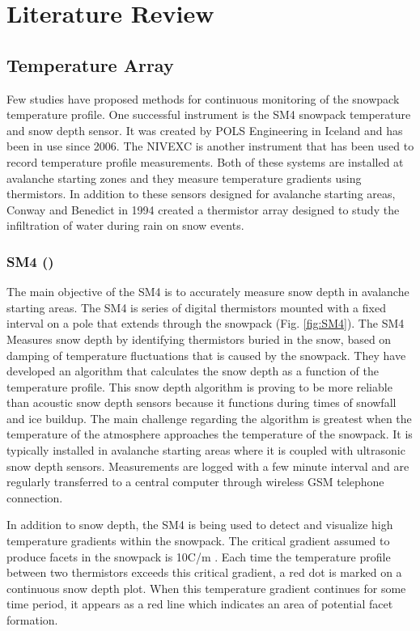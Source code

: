\chapter{Literature Review}
\section{Temperature Array}
Few studies have proposed methods for continuous monitoring of the snowpack temperature profile. One successful instrument is the SM4 snowpack temperature and snow depth sensor. It was created by POLS Engineering in Iceland and has been in use since 2006. The NIVEXC is another instrument that has been used to record temperature profile measurements. Both of these systems are installed at avalanche starting zones and they measure temperature gradients using thermistors. In addition to these sensors designed for avalanche starting areas, Conway and Benedict in 1994 created a thermistor array designed to study the infiltration of water during rain on snow events. 

\subsection{SM4 (\cite{ingolfsson2008sm4})}  The main objective of the SM4 is to accurately measure snow depth in avalanche starting areas. The SM4 is series of digital thermistors mounted with a fixed interval on a pole that extends through the snowpack (Fig. \ref{fig:SM4}). The SM4 Measures snow depth by identifying thermistors buried in the snow, based on damping of temperature fluctuations that is caused by the snowpack. They have developed an algorithm that calculates the snow depth as a function of the temperature profile. This snow depth algorithm is proving to be more reliable than acoustic snow depth sensors because it functions during times of snowfall and ice buildup. The main challenge regarding the algorithm is greatest when the temperature of the atmosphere approaches the temperature of the snowpack. It is typically installed in avalanche starting areas where it is coupled with ultrasonic snow depth sensors. Measurements are logged with a few minute interval and are regularly transferred to a central computer through wireless GSM telephone connection.

In addition to snow depth, the SM4 is being used to detect and visualize high temperature gradients within the snowpack. The critical gradient assumed to produce facets in the snowpack is 10\textdegree C/m \cite{mcclung_schaerer_2009}. Each time the temperature profile between two thermistors exceeds this critical gradient, a red dot is marked on a continuous snow depth plot. When this temperature gradient continues for some time period, it appears as a red line which indicates an area of potential facet formation. 

